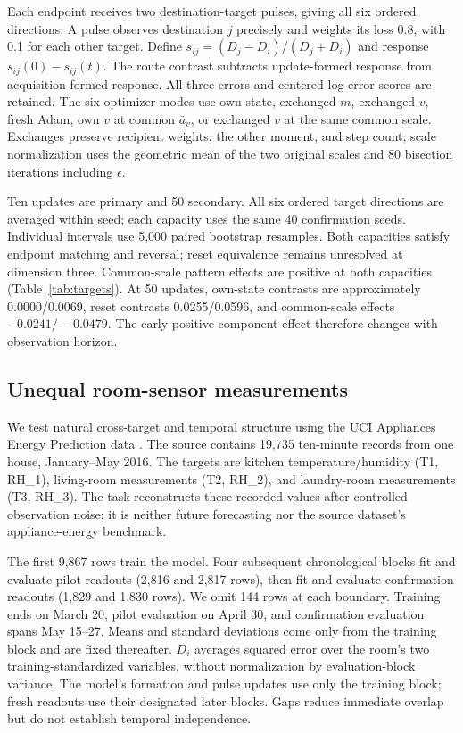 Each endpoint receives two destination-target pulses, giving all six ordered directions. A pulse observes destination $j$ precisely and weights its loss 0.8, with 0.1 for each other target. Define $s_{ij}=(D_j-D_i)/(D_j+D_i)$ and response $s_{ij}(0)-s_{ij}(t)$. The route contrast subtracts update-formed response from acquisition-formed response. All three errors and centered log-error scores are retained. The six optimizer modes use own state, exchanged $m$, exchanged $v$, fresh Adam, own $v$ at common $\bar a_v$, or exchanged $v$ at the same common scale. Exchanges preserve recipient weights, the other moment, and step count; scale normalization uses the geometric mean of the two original scales and 80 bisection iterations including $\epsilon$.

Ten updates are primary and 50 secondary. All six ordered target directions are averaged within seed; each capacity uses the same 40 confirmation seeds. Individual intervals use 5,000 paired bootstrap resamples. Both capacities satisfy endpoint matching and reversal; reset equivalence remains unresolved at dimension three. Common-scale pattern effects are positive at both capacities (Table~\ref{tab:targets}). At 50 updates, own-state contrasts are approximately 0.0000/0.0069, reset contrasts 0.0255/0.0596, and common-scale effects $-0.0241/-0.0479$. The early positive component effect therefore changes with observation horizon.

\subsection{Unequal room-sensor measurements}
\label{app:natural}
We test natural cross-target and temporal structure using the UCI Appliances Energy Prediction data \citep{candanedo2017data,candanedo2017dataset}. The source contains 19,735 ten-minute records from one house, January--May 2016. The targets are kitchen temperature/humidity (T1, RH\_1), living-room measurements (T2, RH\_2), and laundry-room measurements (T3, RH\_3). The task reconstructs these recorded values after controlled observation noise; it is neither future forecasting nor the source dataset's appliance-energy benchmark.

The first 9,867 rows train the model. Four subsequent chronological blocks fit and evaluate pilot readouts (2,816 and 2,817 rows), then fit and evaluate confirmation readouts (1,829 and 1,830 rows). We omit 144 rows at each boundary. Training ends on March 20, pilot evaluation on April 30, and confirmation evaluation spans May 15--27. Means and standard deviations come only from the training block and are fixed thereafter. $D_i$ averages squared error over the room's two training-standardized variables, without normalization by evaluation-block variance. The model's formation and pulse updates use only the training block; fresh readouts use their designated later blocks. Gaps reduce immediate overlap but do not establish temporal independence.


